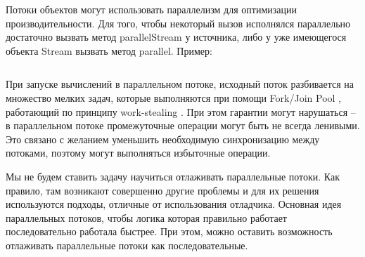 Потоки объектов могут использовать параллелизм для оптимизации производительности. Для того, чтобы некоторый вызов исполнялся параллельно достаточно вызвать метод parallelStream у источника, либо у уже имеющегося объекта Stream вызвать метод parallel. Пример: 
\inputminted{java}{chapter2/code/ParallelStream.java}
При запуске вычислений в параллельном потоке, исходный поток разбивается на множество мелких задач, которые выполняются при помощи Fork/Join Pool \cite{java:forkjoin}, работающий по принципу work-stealing \cite{wiki:worksteal}. При этом гарантии могут нарушаться -- в параллельном потоке промежуточные операции могут быть не всегда ленивыми. Это связано с желанием уменьшить необходимую синхронизацию между потоками, поэтому могут выполняться избыточные операции.

Мы не будем ставить задачу научиться отлаживать параллельные потоки. Как правило, там возникают совершенно другие проблемы и для их решения используются подходы, отличные от использования отладчика. Основная идея параллельных потоков, чтобы логика которая правильно работает последовательно работала быстрее. При этом, можно оставить возможность отлаживать параллельные потоки как последовательные.